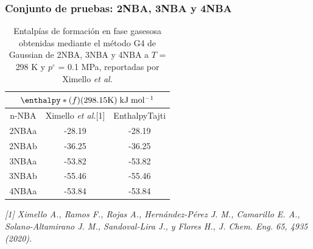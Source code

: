 \documentclass{beamer}
\begin{document}

\begin{frame}
\frametitle{Conjunto de pruebas: 2NBA, 3NBA y 4NBA}

\begin{table}[H]
\centering
\begin{tabular}{|c|c|c|}
\hline
	\multicolumn{3}{||c||}{$\enthalpy*(f){}(298.15 \mathrm{K})\; \mathrm{kJ\;mol^{-1}}$}\\
\hline
\hline
	n-NBA & Ximello \textit{et al.}[1] & EnthalpyTajti\\ 
\hline 
2NBAa & -28.19 & -28.19\\
\hline
2NBAb & -36.25 & -36.25\\ 
\hline 
3NBAa & -53.82 & -53.82\\
\hline
3NBAb & -55.46 & -55.46\\ 
\hline 
4NBAa & -53.84 & -53.84\\ 
\hline  
\end{tabular} 
	\caption{Entalpías de formación en fase gasesosa obtenidas mediante el método G4 de Gaussian de 2NBA, 3NBA y 4NBA a $T$ = 298 K y $p^{\circ}$ = 0.1 MPa, reportadas por Ximello \textit{et al.}}
\label{Ximello-table-1}
\end{table}
\textit{\tiny{[1] Ximello A., Ramos F., Rojas A., Hernández-Pérez J. M., Camarillo E. A., Solano-Altamirano J. M., Sandoval-Lira J., y Flores H., J. Chem. Eng. 65, 4935 (2020).}}
\end{frame}
\end{document}
